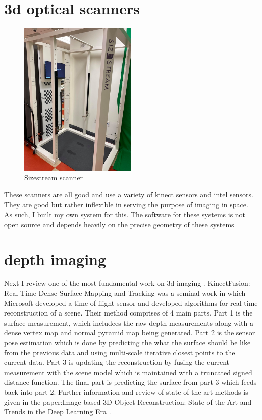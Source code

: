 \section{3d optical scanners}
\begin{figure}[h]
	\caption{Sizestream scanner}
	\centering
	\includegraphics[width=0.5\textwidth]{images/sizestream.jpg}
\end{figure}

These scanners are all good and use a variety of kinect sensors and intel sensors.
They are good but rather inflexible in serving the purpose of imaging in space. As such, I built my own system for this. The software for these systems is not open source and depends heavily on the precise geometry of these systems

\section{depth imaging}

Next I review one of the most fundamental work on 3d imaging \cite{izadi2011kinectfusion}. KinectFusion: Real-Time Dense Surface Mapping and Tracking was a seminal work in which Microsoft developed a time of flight sensor and developed algorithms for real time reconstruction of a scene. Their method comprises of 4 main parts. Part 1 is the surface measurement, which includees the raw depth measurements along with a dense vertex map and normal pyramid map being generated. Part 2 is the sensor pose estimation which is done by predicting the what the surface should be like from the previous data and using multi-scale iterative closest points to the current data. Part 3 is updating the reconstruction by fusing the current measurement with the scene model which is maintained with a truncated signed distance function. The final part is predicting the surface from part 3 which feeds back into part 2.
Further information and review of state of the art methods is given in the paper:Image-based 3D Object Reconstruction: State-of-the-Art and Trends in the Deep Learning Era \cite{DBLP:journals/corr/abs-1906-06543}.

